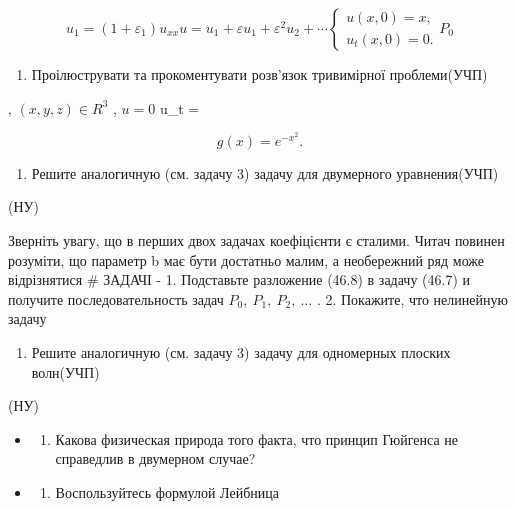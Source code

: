\documentclass[
  ukrainian,
]{article}
\providecommand{\tightlist}{%
  \setlength{\itemsep}{0pt}\setlength{\parskip}{0pt}}
\begin{document}
\[
u_1 = (1 + \varepsilon_1) u_{xx}
u = u_1 + \varepsilon u_1 + \varepsilon^2 u_2 + \cdots
\begin{cases} u(x, 0) = x, \\ u_t(x, 0) = 0. \end{cases}
P_{0}
\]

\begin{enumerate}
\def\labelenumi{\arabic{enumi}.}
\setcounter{enumi}{2}
\tightlist
\item
  Проілюструвати та прокоментувати розв'язок тривимірної проблеми(УЧП)
\end{enumerate}

, \((x, y, z) \in R^3\) , \(u = 0\) u\_t =

\[
g(x) = e^{-x^2}.
\]

\begin{enumerate}
\def\labelenumi{\arabic{enumi}.}
\setcounter{enumi}{3}
\tightlist
\item
  Решите аналогичную (см. задачу 3) задачу для двумерного уравнения(УЧП)
\end{enumerate}

(НУ)

Зверніть увагу, що в перших двох задачах коефіцієнти є сталими. Читач
повинен розуміти, що параметр b має бути достатньо малим, а необережний
ряд може відрізнятися \# ЗАДАЧІ - 1. Подставьте разложение (46.8) в
задачу (46.7) и получите последовательность задач
\(P_0,\ P_1,\ P_2,\ \dots\) . 2. Покажите, что нелинейную задачу

\begin{enumerate}
\def\labelenumi{\arabic{enumi}.}
\setcounter{enumi}{4}
\tightlist
\item
  Решите аналогичную (см. задачу 3) задачу для одномерных плоских
  волн(УЧП)
\end{enumerate}

(НУ)

\begin{itemize}
\tightlist
\item
  \begin{enumerate}
  \def\labelenumi{\arabic{enumi}.}
  \setcounter{enumi}{5}
  \tightlist
  \item
    Какова физическая природа того факта, что принцип Гюйгенса не
    справедлив в двумерном случае?
  \end{enumerate}
\item
  \begin{enumerate}
  \def\labelenumi{\arabic{enumi}.}
  \setcounter{enumi}{6}
  \tightlist
  \item
    Воспользуйтесь формулой Лейбница
  \end{enumerate}
\end{itemize}
\end{document}
